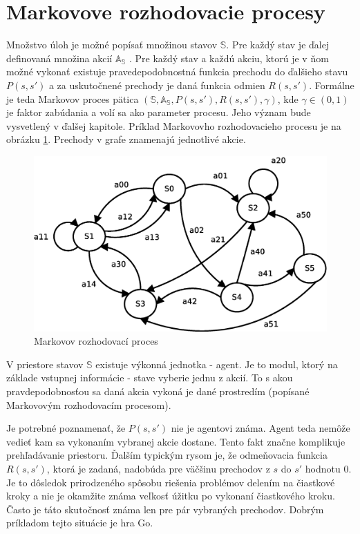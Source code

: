\section{Markovove rozhodovacie procesy}


Množstvo úloh je možné popísať množinou stavov $\mathbb{S}$. Pre každý stav je ďalej
definovaná množina akcií $\mathbb{A_S}$ \cite{bib:markov_01} \cite{bib:markov_02}. Pre každý stav a každú akciu, ktorú je v ňom možné vykonať existuje pravedepodobnostná
funkcia prechodu do ďalšieho stavu $P(s, s')$ a za uskutočnené prechody je daná funkcia odmien $R(s, s')$.
Formálne je teda Markovov proces pätica $(\mathbb{S}, \mathbb{A_S}, P(s, s'), R(s, s'), \gamma )$,
kde $\gamma \in (0, 1)$ je faktor zabúdania a volí sa ako parameter procesu. Jeho význam bude vysvetlený
v ďalšej kapitole. Príklad Markovovho rozhodovacieho procesu je na obrázku \ref{img:markovov_decision_process}.
Prechody v grafe znamenajú jednotlivé akcie.

\begin{figure}[!htb]
\center
\includegraphics[scale=.5]{../diagrams/markovov_process.eps}
\caption{Markovov rozhodovací proces}
\label{img:markovov_decision_process}
\end{figure}

V priestore stavov $\mathbb{S}$ existuje výkonná jednotka - agent. Je to modul,
ktorý na základe vstupnej informácie - stave vyberie jednu z akcií. To s akou pravdepodobnosťou
sa daná akcia vykoná je dané prostredím (popísané Markovovým rozhodovacím procesom).

Je potrebné poznamenať, že $P(s, s')$ nie je agentovi známa. Agent teda nemôže
vedieť kam sa vykonaním vybranej akcie dostane. Tento fakt značne komplikuje prehľadávanie
priestoru.
Ďalším typickým rysom je, že odmeňovacia funkcia $R(s, s')$, ktorá je zadaná,
nadobúda pre väčšinu prechodov z $s$ do $s'$ hodnotu 0. Je to dôsledok prirodzeného
spôsobu riešenia problémov delením na čiastkové kroky a nie je okamžite známa
veľkosť úžitku po vykonaní čiastkového kroku. Často je táto skutočnosť známa
len pre pár vybraných prechodov.
Dobrým príkladom tejto situácie je hra Go.

